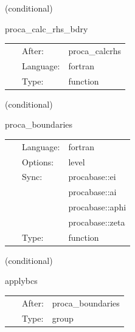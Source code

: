 \vspace{5mm}

   (conditional) 

\hspace{5mm} proca\_calc\_rhs\_bdry 

\hspace{5mm}{\it mol boundary rhs calculation for proca variables } 


\hspace{5mm}

 \begin{tabular*}{160mm}{cll} 
~ & After:  & proca\_calcrhs \\ 
~ & Language:  & fortran \\ 
~ & Type:  & function \\ 
\end{tabular*} 


\vspace{5mm}

   (conditional) 

\hspace{5mm} proca\_boundaries 

\hspace{5mm}{\it mol boundary enforcement for proca variables } 


\hspace{5mm}

 \begin{tabular*}{160mm}{cll} 
~ & Language:  & fortran \\ 
~ & Options:  & level \\ 
~ & Sync:  & procabase::ei \\ 
~& ~ &procabase::ai\\ 
~& ~ &procabase::aphi\\ 
~& ~ &procabase::zeta\\ 
~ & Type:  & function \\ 
\end{tabular*} 


\vspace{5mm}

   (conditional) 

\hspace{5mm} applybcs 

\hspace{5mm}{\it apply boundary conditions } 


\hspace{5mm}

 \begin{tabular*}{160mm}{cll} 
~ & After:  & proca\_boundaries \\ 
~ & Type:  & group \\ 
\end{tabular*} 


